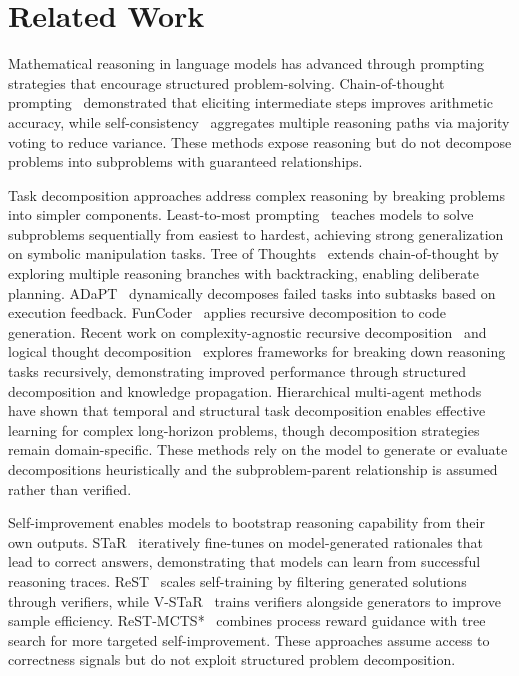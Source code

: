 \documentclass[a4paper,fleqn]{cas-dc}
\theoremstyle{definition}
\begin{document}
\section{Related Work}
\label{sec:related_work}

Mathematical reasoning in language models has advanced through prompting strategies that encourage structured problem-solving. Chain-of-thought prompting~\cite{cot} demonstrated that eliciting intermediate steps improves arithmetic accuracy, while self-consistency~\cite{self-consistency} aggregates multiple reasoning paths via majority voting to reduce variance. These methods expose reasoning but do not decompose problems into subproblems with guaranteed relationships.

Task decomposition approaches address complex reasoning by breaking problems into simpler components. Least-to-most prompting~\cite{least-to-most} teaches models to solve subproblems sequentially from easiest to hardest, achieving strong generalization on symbolic manipulation tasks. Tree of Thoughts~\cite{tot} extends chain-of-thought by exploring multiple reasoning branches with backtracking, enabling deliberate planning. ADaPT~\cite{adapt} dynamically decomposes failed tasks into subtasks based on execution feedback. FunCoder~\cite{funcoder} applies recursive decomposition to code generation. Recent work on complexity-agnostic recursive decomposition~\cite{cardt} and logical thought decomposition~\cite{rdolt} explores frameworks for breaking down reasoning tasks recursively, demonstrating improved performance through structured decomposition and knowledge propagation. Hierarchical multi-agent methods~\cite{hisoma-decomposition} have shown that temporal and structural task decomposition enables effective learning for complex long-horizon problems, though decomposition strategies remain domain-specific. These methods rely on the model to generate or evaluate decompositions heuristically and the subproblem-parent relationship is assumed rather than verified.

Self-improvement enables models to bootstrap reasoning capability from their own outputs. STaR~\cite{star} iteratively fine-tunes on model-generated rationales that lead to correct answers, demonstrating that models can learn from successful reasoning traces. ReST~\cite{rest-em} scales self-training by filtering generated solutions through verifiers, while V-STaR~\cite{v-star} trains verifiers alongside generators to improve sample efficiency. ReST-MCTS*~\cite{rest-mcts} combines process reward guidance with tree search for more targeted self-improvement. These approaches assume access to correctness signals but do not exploit structured problem decomposition.
\end{document}
